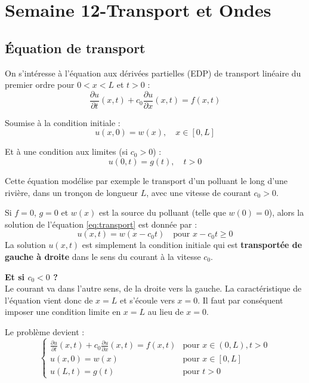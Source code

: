 \section{Semaine 12-Transport et Ondes}
\subsection{Équation de transport}

On s'intéresse à l'équation aux dérivées partielles (EDP) de transport linéaire du premier ordre pour $0 < x < L$ et $t > 0$ :
\begin{equation}
\label{eq:transport}
\frac{\partial u}{\partial t}(x,t) + c_0 \frac{\partial u}{\partial x}(x,t) = f(x,t)
\end{equation}

Soumise à la condition initiale :
\begin{equation*}
u(x,0) = w(x), \quad x \in [0,L]
\end{equation*}

Et à une condition aux limites (si $c_0 > 0$) :
\begin{equation*}
u(0,t) = g(t), \quad t > 0
\end{equation*}

Cette équation modélise par exemple le transport d'un polluant le long d'une rivière, dans un tronçon de longueur $L$, avec une vitesse de courant $c_0 > 0$.

\begin{exemple}
Si $f = 0$, $g = 0$ et $w(x)$ est la source du polluant (telle que $w(0) = 0$), alors la solution de l'équation \eqref{eq:transport} est donnée par :
\begin{equation*}
u(x,t) = w(x - c_0 t) \quad \text{pour } x - c_0 t \ge 0
\end{equation*}
La solution $u(x,t)$ est simplement la condition initiale qui est \textbf{transportée de gauche à droite} dans le sens du courant à la vitesse $c_0$.
\end{exemple}

\textbf{Et si $c_0 < 0$ ?} \\
Le courant va dans l'autre sens, de la droite vers la gauche. La caractéristique de l'équation vient donc de $x=L$ et s'écoule vers $x=0$. Il faut par conséquent imposer une condition limite en $x = L$ au lieu de $x = 0$.

Le problème devient :
\begin{equation}
\begin{cases}
\frac{\partial u}{\partial t}(x,t) + c_0 \frac{\partial u}{\partial x}(x,t) = f(x,t) & \text{pour } x \in (0,L), t>0 \\
u(x,0) = w(x) & \text{pour } x \in [0,L] \\
u(L,t) = g(t) & \text{pour } t > 0
\end{cases}
\end{equation}

